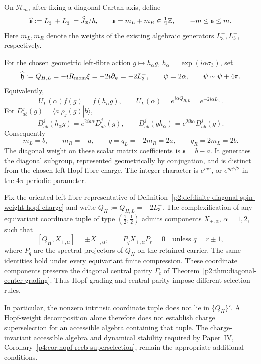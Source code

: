 \documentclass[12pt,a4paper]{article}
\begin{document}
\begin{definition}
\label{p2:def:finite-diagonal-spin-weight-hopf-charge}
On \(\mathcal H_m\), after fixing a diagonal Cartan axis, define
\[
 \widehat{\mathfrak s}:=L_3^++L_3^-=\widehat J_3/\hbar,\qquad
 \mathfrak s=m_L+m_R\in\tfrac12\mathbb{Z},\qquad
 -m\le\mathfrak s\le m.
\]
Here \(m_L,m_R\) denote the weights of the existing algebraic generators
\(L_3^+,L_3^-\), respectively.

For the chosen geometric left-fibre action
\(g\mapsto h_\alpha g\), \(h_\alpha=\exp(i\alpha\sigma_3)\), set
\[
 \widehat{\mathfrak h}:=Q_{H,L}
 =-iR_{\mathrm{mom}}\xi=-2i\partial_\psi=-2L_3^-,
 \qquad \psi=2\alpha,\qquad \psi\sim\psi+4\pi.
\]
Equivalently,
\[
 U_L(\alpha)f(g)=f(h_\alpha g),\qquad
 U_L(\alpha)=e^{i\alpha Q_{H,L}}=e^{-2i\alpha L_3^-}.
\]
For \(D^j_{ab}(g)=\langle a|\rho_j(g)|b\rangle\),
\[
 D^j_{ab}(h_\alpha g)=e^{2ia\alpha}D^j_{ab}(g),\qquad
 D^j_{ab}(gh_\alpha)=e^{2ib\alpha}D^j_{ab}(g).
\]
Consequently
\[
 \boxed{m_L=b,\qquad m_R=-a,\qquad q=q_L=-2m_R=2a,}
 \qquad q_R=2m_L=2b.
\]
The diagonal weight on these scalar matrix coefficients is
\(\mathfrak s=b-a\).  It generates the diagonal subgroup, represented
geometrically by conjugation, and is distinct from the chosen left
Hopf-fibre charge.  The integer character is \(e^{iq\alpha}\), or
\(e^{iq\psi/2}\) in the \(4\pi\)-periodic parameter.
\end{definition}

\begin{proposition}
\label{p2d:prop:coordinate-hopf-charge-steps}
Fix the oriented left-fibre representative of
Definition~\ref{p2:def:finite-diagonal-spin-weight-hopf-charge} and write
\(Q_H:=Q_{H,L}=-2L_3^-\).  The complexification of any equivariant
coordinate tuple of type \((\tfrac12,\tfrac12)\) admits components
\(X_{\pm,\alpha}\), \(\alpha=1,2\), such that
\[
 \boxed{[Q_H,X_{\pm,\alpha}]=\pm X_{\pm,\alpha},\qquad
 P_qX_{\pm,\alpha}P_r=0\quad\text{unless }q=r\pm1,}
\]
where \(P_q\) are the spectral projectors of \(Q_H\) on the retained
carrier.  The same identities hold under every equivariant finite
compression.  These coordinate components preserve the diagonal central
parity \(\Gamma_c\) of Theorem~\ref{p2:thm:diagonal-center-grading}.
Thus Hopf grading and central parity impose different selection rules.

In particular, the nonzero intrinsic coordinate tuple does not lie in
\(\{Q_H\}'\).  A Hopf-weight decomposition alone therefore does not
establish charge superselection for an accessible algebra containing that
tuple.  The charge-invariant accessible algebra and dynamical stability
required by Paper~IV, Corollary~\ref{p4:cor:hopf-reeb-superselection},
remain the appropriate additional conditions.
\end{proposition}
\end{document}
